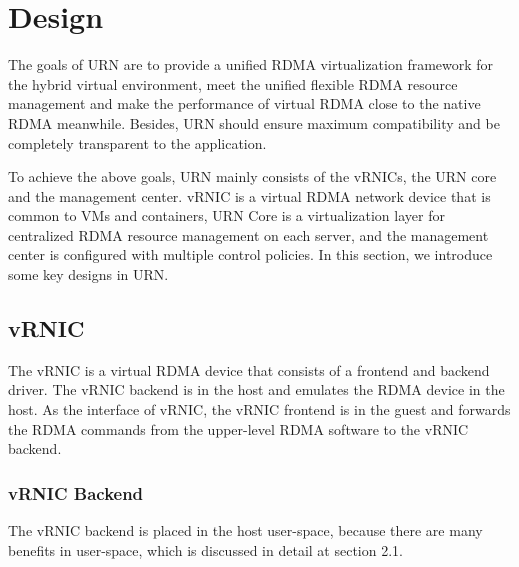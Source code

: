 \section{Design}

The goals of URN are to provide a unified RDMA virtualization framework for the hybrid virtual environment, meet the unified flexible RDMA resource management and make the performance of virtual RDMA close to the native RDMA meanwhile. Besides, URN should ensure maximum compatibility and be completely transparent to the application. 

To achieve the above goals, URN mainly consists of the vRNICs, the URN core and the management center. vRNIC is a virtual RDMA network device that is common to VMs and containers, URN Core is a virtualization layer for centralized RDMA resource management on each server, and the management center is configured with multiple control policies. In this section, we introduce some key designs in URN.

\subsection{vRNIC}

The vRNIC is a virtual RDMA device that consists of a frontend and backend driver. The vRNIC backend is in the host and emulates the RDMA device in the host. As the interface of vRNIC, the vRNIC frontend is in the guest and forwards the RDMA commands from the upper-level RDMA software to the vRNIC backend. 

\subsubsection{vRNIC Backend}

The vRNIC backend is placed in the host user-space, because there are many benefits in user-space, which is discussed in detail at section 2.1.

